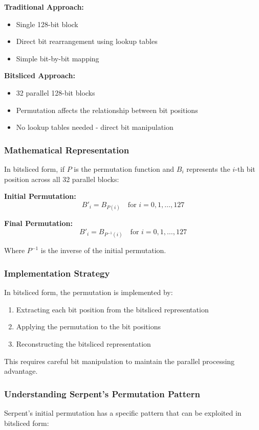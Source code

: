 \documentclass[12pt,a4paper]{article}
\begin{document}
\textbf{Traditional Approach:}
\begin{itemize}
    \item Single 128-bit block
    \item Direct bit rearrangement using lookup tables
    \item Simple bit-by-bit mapping
\end{itemize}

\textbf{Bitsliced Approach:}
\begin{itemize}
    \item 32 parallel 128-bit blocks
    \item Permutation affects the relationship between bit positions
    \item No lookup tables needed - direct bit manipulation
\end{itemize}

\subsubsection{Mathematical Representation}
In bitsliced form, if $P$ is the permutation function and $B_i$ represents the $i$-th bit position across all 32 parallel blocks:

\textbf{Initial Permutation:}
$$B'_i = B_{P(i)} \quad \text{for } i = 0, 1, \ldots, 127$$

\textbf{Final Permutation:}
$$B'_i = B_{P^{-1}(i)} \quad \text{for } i = 0, 1, \ldots, 127$$

Where $P^{-1}$ is the inverse of the initial permutation.

\subsubsection{Implementation Strategy}
In bitsliced form, the permutation is implemented by:
\begin{enumerate}
    \item Extracting each bit position from the bitsliced representation
    \item Applying the permutation to the bit positions
    \item Reconstructing the bitsliced representation
\end{enumerate}

This requires careful bit manipulation to maintain the parallel processing advantage.

\subsubsection{Understanding Serpent's Permutation Pattern}
Serpent's initial permutation has a specific pattern that can be exploited in bitsliced form:
\end{document}
